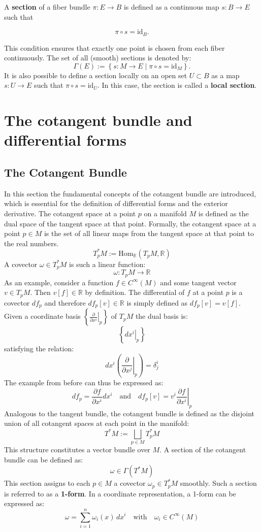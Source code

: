 A \textbf{section} of a fiber bundle \(\pi : E \to B\) is defined as a continuous map \(s: B \to E\) such that

\[
\pi \circ s = \mathrm{id}_B.
\]

This condition ensures that exactly one point is chosen from each fiber continuously. 
The set of all (smooth) sections is denoted by:
\[
\Gamma(E) := \left\{ s: M \to E \mid \pi \circ s = \mathrm{id}_{M} \right\}.
\]
It is also possible to define a section locally on an open set \(U \subset B\) as a map \(s: U \to E\) such that \(\pi \circ s = \mathrm{id}_U\). In this case, the section is called a \textbf{local section}.


\section{The cotangent bundle and differential forms}

\subsection{The Cotangent Bundle}
In this section the fundamental concepts of the cotangent bundle are introduced, which is essential for the definition of differential forms and the exterior derivative. The cotangent space at a point $p$ on a manifold $M$ is defined as the dual space of the tangent space at that point. Formally, the cotangent space at a point $p \in M$ is the set of all linear maps from the tangent space at that point to the real numbers\cite{NakaharaGeometrytopologyphysics2005}.
\[
T_p^*M := \text{Hom}_\mathbb{R}(T_p M, \mathbb{R})
\]
A covector \(\omega \in T_p^*M\) is such a linear function:
\[
\omega: T_p M \to \mathbb{R}
\]
As an example, consider a function \(f \in C^\infty(M)\) and some tangent vector $v \in T_pM$. Then $v[f] \in \mathbb{R}$ by definition. The differential of \(f\) at a point \(p\) is a covector $df_p$ and therefore $df_p[v]\in \mathbb{R}$ is simply defined as $df_p[v] = v[f]$.
Given a coordinate basis \(\left\{ \left. \frac{\partial}{\partial x^i} \right|_p \right\}\)  of \(T_p M\) the dual basis is:
\[
\left\{ \left. dx^i \right|_p \right\}
\]
satisfying the relation:
\[
dx^i\left( \left. \frac{\partial}{\partial x^j} \right|_p \right) = \delta^i_j
\]
The example from before can thus be expressed as:
\[
df_p = \frac{\partial f}{\partial x^i} dx^i \quad \text{and} \quad df_p[v] = v^i \left. \frac{\partial f}{\partial x^i} \right|_p
\]
Analogous to the tangent bundle, the cotangent bundle is defined as the disjoint union of all cotangent spaces at each point in the manifold:
\[
T^*M := \bigsqcup_{p \in M} T_p^* M
\]
This structure constitutes a vector bundle over \(M\). A section of the cotangent bundle can be defined as:
\[
\omega \in \Gamma(T^* M)
\]
This section assigns to each \(p \in M\) a covector \(\omega_p \in T_p^*M\) smoothly. Such a section is referred to as a \textbf{1-form}. In a coordinate representation, a 1-form can be expressed as:
\[
\omega = \sum_{i=1}^n \omega_i(x) \, dx^i
\quad \text{with} \quad \omega_i \in C^\infty(M)
\]

